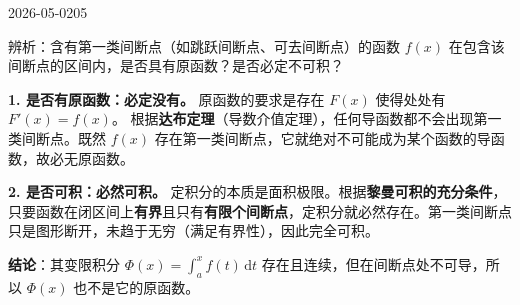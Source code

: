 \begin{mistake}{2026-05-02}{05}

\begin{problemcontent}
辨析：含有第一类间断点（如跳跃间断点、可去间断点）的函数 \(f(x)\) 在包含该间断点的区间内，是否具有原函数？是否必定不可积？
\end{problemcontent}

\begin{solutioncontent}
\textbf{1. 是否有原函数：必定没有。}
原函数的要求是存在 \(F(x)\) 使得处处有 \(F'(x) = f(x)\)。
根据\textbf{达布定理}（导数介值定理），任何导函数都不会出现第一类间断点。既然 \(f(x)\) 存在第一类间断点，它就绝对不可能成为某个函数的导函数，故必无原函数。

\textbf{2. 是否可积：必然可积。}
定积分的本质是面积极限。根据\textbf{黎曼可积的充分条件}，只要函数在闭区间上\textbf{有界}且只有\textbf{有限个间断点}，定积分就必然存在。第一类间断点只是图形断开，未趋于无穷（满足有界性），因此完全可积。

\textbf{结论}：其变限积分 \(\Phi(x) = \int_a^x f(t)\,\mathrm{d}t\) 存在且连续，但在间断点处不可导，所以 \(\Phi(x)\) 也不是它的原函数。
\end{solutioncontent}


\end{mistake}
